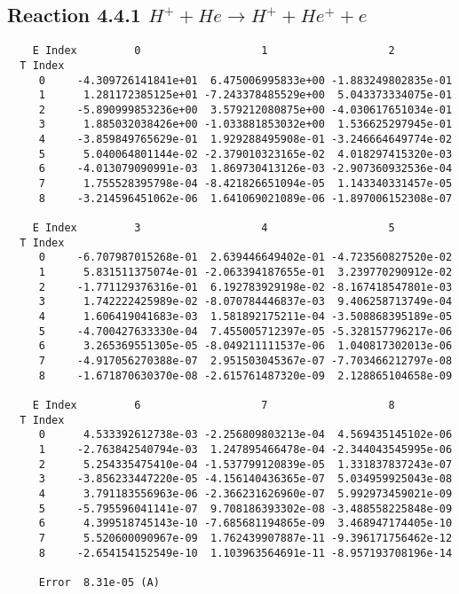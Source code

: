 \documentclass[12pt]{article}
\begin{document}
                               


\newpage
\subsection{
Reaction 4.4.1 $    H^+ + He \rightarrow H^+ + He^+ + e$}


\begin{small}\begin{verbatim}
    E Index         0                   1                   2
  T Index
     0     -4.309726141841e+01  6.475006995833e+00 -1.883249802835e-01
     1      1.281172385125e+01 -7.243378485529e+00  5.043373334075e-01
     2     -5.890999853236e+00  3.579212080875e+00 -4.030617651034e-01
     3      1.885032038426e+00 -1.033881853032e+00  1.536625297945e-01
     4     -3.859849765629e-01  1.929288495908e-01 -3.246664649774e-02
     5      5.040064801144e-02 -2.379010323165e-02  4.018297415320e-03
     6     -4.013079090991e-03  1.869730413126e-03 -2.907360932536e-04
     7      1.755528395798e-04 -8.421826651094e-05  1.143340331457e-05
     8     -3.214596451062e-06  1.641069021089e-06 -1.897006152308e-07

    E Index         3                   4                   5
  T Index
     0     -6.707987015268e-01  2.639446649402e-01 -4.723560827520e-02
     1      5.831511375074e-01 -2.063394187655e-01  3.239770290912e-02
     2     -1.771129376316e-01  6.192783929198e-02 -8.167418547801e-03
     3      1.742222425989e-02 -8.070784446837e-03  9.406258713749e-04
     4      1.606419041683e-03  1.581892175211e-04 -3.508868395189e-05
     5     -4.700427633330e-04  7.455005712397e-05 -5.328157796217e-06
     6      3.265369551305e-05 -8.049211111537e-06  1.040817302013e-06
     7     -4.917056270388e-07  2.951503045367e-07 -7.703466212797e-08
     8     -1.671870630370e-08 -2.615761487320e-09  2.128865104658e-09

    E Index         6                   7                   8
  T Index
     0      4.533392612738e-03 -2.256809803213e-04  4.569435145102e-06
     1     -2.763842540794e-03  1.247895466478e-04 -2.344043545995e-06
     2      5.254335475410e-04 -1.537799120839e-05  1.331837837243e-07
     3     -3.856233447220e-05 -4.156140436365e-07  5.034959925043e-08
     4      3.791183556963e-06 -2.366231626960e-07  5.992973459021e-09
     5     -5.795596041141e-07  9.708186393302e-08 -3.488558225848e-09
     6      4.399518745143e-10 -7.685681194865e-09  3.468947174405e-10
     7      5.520600090967e-09  1.762439907887e-11 -9.396171756462e-12
     8     -2.654154152549e-10  1.103963564691e-11 -8.957193708196e-14

     Error  8.31e-05 (A)
\end{verbatim}\end{small}
\end{document}

